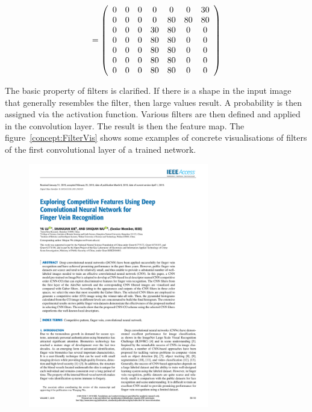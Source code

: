 {$$
=
\left(
\begin{array}{ccc ccc c}
    0 & 0 & 0 &  0 & 0  &  0 & 30 \\
    0 & 0 & 0 &  0 & 80 & 80 & 80 \\
    0 & 0 & 0 & 30 & 80 &  0 &  0 \\
    0 & 0 & 0 & 80 & 80 &  0 &  0 \\
    0 & 0 & 0 & 80 & 80 &  0 &  0 \\
    0 & 0 & 0 & 80 & 80 &  0 &  0 \\
    0 & 0 & 0 & 80 & 80 &  0 &  0 \\
\end{array}
\right)
$$  

The basic property of filters is clarified. If there is a shape in the input image that generally resembles the filter, then large values result. A probability is then assigned via the activation function. Various filters are then defined and applied in the convolution layer. The result is then the feature map. The figure~\ref{concept:FilterVis} shows some examples of concrete visualisations of filters of the first convolutional layer of a trained network. 


\begin{figure}[!h]
  \centering
  
  \includegraphics[viewport=0 350 280 480,clip,page=2,width=0.7\textwidth]{../../MLbib/CNN/08663285.pdf}
    

\end{figure}}
